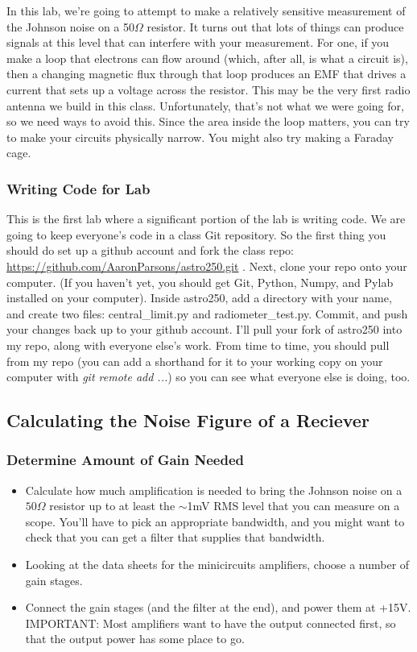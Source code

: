 \documentclass[11pt]{article}
\begin{document}
In this lab, we're going to attempt to make a relatively sensitive measurement of the Johnson
noise on a 50$\Omega$ resistor.  It turns out that lots of things can produce signals at this 
level that can interfere with your measurement.  For one, if you make a loop that electrons can
flow around (which, after all, is what a circuit is), then a changing magnetic flux through that
loop produces an EMF that drives a current that sets up a voltage across the resistor.  This may
be the very first radio antenna we build in this class.  Unfortunately, that's not what we were
going for, so we need ways to avoid this.  Since the area inside the loop matters, you can try to
make your circuits physically narrow.  You might also try making a Faraday cage.

\subsubsection*{Writing Code for Lab}

This is the first lab where a significant portion of the lab is writing code.  We are going to keep
everyone's code in a class Git repository.  So the first thing you should do set up a github
account and fork the class repo: \url{https://github.com/AaronParsons/astro250.git} .
Next, clone your repo onto your computer.  (If you haven't yet, you should get Git, Python, Numpy,
and Pylab installed on your computer).  Inside astro250, add a directory with your name, and create
two files: central\_limit.py and radiometer\_test.py.  Commit, and push your changes back up to
your github account.  I'll pull your fork of astro250 into
my repo, along with everyone else's work.  From time to time, you should pull from my repo (you
can add a shorthand for it to your working copy on your computer with {\it git remote add ...})
so you can see what everyone else is doing, too.

\subsection{Calculating the Noise Figure of a Reciever}

\subsubsection*{Determine Amount of Gain Needed}
\begin{itemize}
\item Calculate how much amplification is needed to bring the Johnson noise on a $50\Omega$ resistor
up to at least the $\sim$1mV RMS level that you can measure on a scope.  You'll have to pick an appropriate
bandwidth, and you might want to check that you can get a filter that supplies that bandwidth. 
\item Looking at the data sheets for the minicircuits amplifiers, choose a number of gain stages.
\item Connect the gain stages (and the filter at the end), and power them at +15V.  IMPORTANT: Most amplifiers
want to have the output connected first, so that the output power has some place to go.
\end{itemize}
\end{document}
